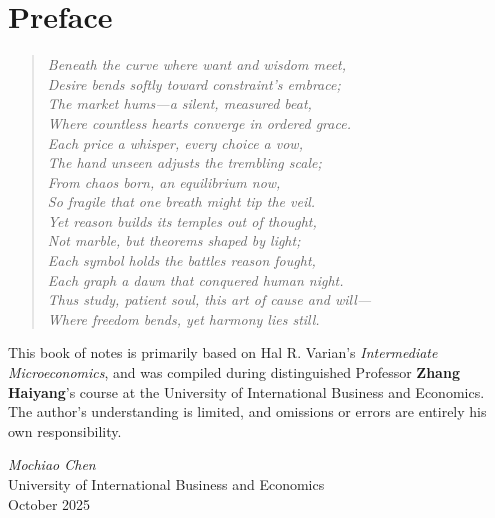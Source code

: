 \documentclass{book}
\begin{document}
\addtocounter{page}{2}
\chapter*{Preface}

\begin{verse}
\textit{Beneath the curve where want and wisdom meet,\\
Desire bends softly toward constraint's embrace;\\
The market hums—a silent, measured beat,\\
Where countless hearts converge in ordered grace.\\

Each price a whisper, every choice a vow,\\
The hand unseen adjusts the trembling scale;\\
From chaos born, an equilibrium now,\\
So fragile that one breath might tip the veil.\\

Yet reason builds its temples out of thought,\\
Not marble, but theorems shaped by light;\\
Each symbol holds the battles reason fought,\\
Each graph a dawn that conquered human night.\\

Thus study, patient soul, this art of cause and will—\\
Where freedom bends, yet harmony lies still.}
\end{verse}

\vspace{1em}

This book of notes is primarily based on Hal R. Varian's \textit{Intermediate Microeconomics},  
and was compiled during distinguished Professor \textbf{Zhang Haiyang}'s course at the University of International Business and Economics.  
The author's understanding is limited, and omissions or errors are entirely his own responsibility.

\begin{flushright}
\textit{Mochiao Chen}\\
University of International Business and Economics\\
October 2025
\end{flushright}


\setcounter{tocdepth}{3}
\tableofcontents

\mainmatter%













\backmatter%
\printindex
\end{document}
